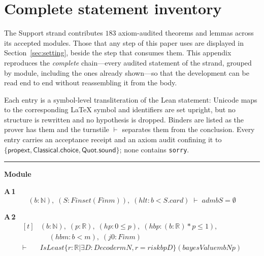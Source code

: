 \appendices
\section{Complete statement inventory}
\label{app:inventory}

The Support strand contributes $183$ axiom-audited theorems and lemmas across its accepted modules. Those that any step of this paper uses are displayed in Section~\ref{sec:setting}, beside the step that consumes them. This appendix reproduces the \emph{complete} chain---every audited statement of the strand, grouped by module, including the ones already shown---so that the development can be read end to end without reassembling it from the body.

Each entry is a symbol-level transliteration of the Lean statement: Unicode maps to the corresponding \LaTeX{} symbol and identifiers are set upright, but no structure is rewritten and no hypothesis is dropped. Binders are listed as the prover has them and the turnstile $\vdash$ separates them from the conclusion. Every entry carries an acceptance receipt and an axiom audit confining it to $\{\textsf{propext},\textsf{Classical.choice},\textsf{Quot.sound}\}$; none contains \texttt{sorry}.

\vspace{4pt}\noindent\rule{\columnwidth}{0.4pt}\par\vspace{2pt}
\noindent\textbf{Module }\par\vspace{3pt}

\noindent\textbf{A\,1}\quad{}
{\footnotesize\[ (\mathit{b} : \mathbb{N} ),\; (\mathit{S} : \mathit{Finset} (\mathit{Fin} \mathit{m})),\; (\mathit{hlt} : \mathit{b} < \mathit{S}.\mathit{card}) \;\vdash\; \mathit{adm} \mathit{b} \mathit{S} = \emptyset \]}

\noindent\textbf{A\,2}\quad{}
{\footnotesize\[ \begin{aligned}[t]
&(\mathit{b} : \mathbb{N} ),\; (\mathit{p} : \mathbb{R} ),\; (\mathit{hp} : 0 \leq \mathit{p}),\; (\mathit{hbp} : (\mathit{b} : \mathbb{R} ) * \mathit{p} \leq 1),\\
&\quad \; (\mathit{hbm} : \mathit{b} < \mathit{m}),\; (\mathit{j0} : \mathit{Fin} \mathit{m})\\
\vdash\;&\mathit{IsLeast} \{ \mathit{r} : \mathbb{R} | \exists \mathit{D} : \mathit{Decoder} \mathit{m} \mathit{N}, \mathit{r} = \mathit{risk} \mathit{b} \mathit{p} \mathit{D}\} (\mathit{bayesValue} \mathit{m} \mathit{b} \mathit{N} \mathit{p})
\end{aligned} \]}

